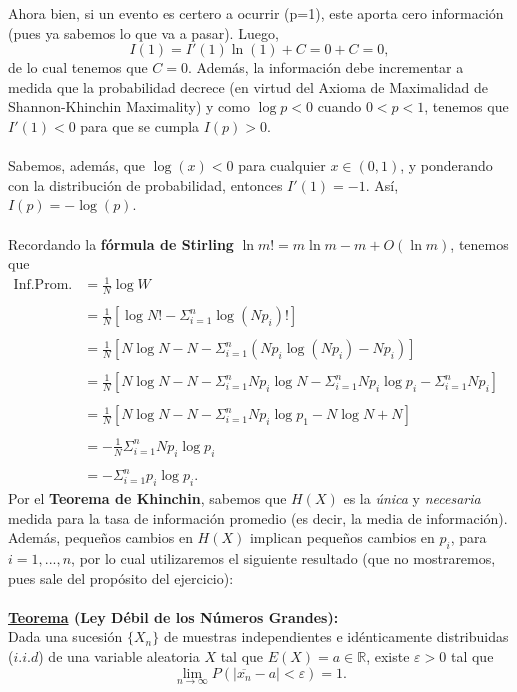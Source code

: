 \documentclass{article}
\begin{document}
Ahora bien, si un evento es certero a ocurrir (p=1), este aporta cero información (pues ya sabemos lo que va a pasar). Luego,\[I(1) = I'(1) \ln(1) + C = 0+ C = 0,\] de lo cual tenemos que $C=0$. Además, la información debe incrementar a medida que la probabilidad decrece (en virtud del Axioma de Maximalidad de Shannon-Khinchin Maximality) y como $\log p <0$ cuando $0 < p < 1$, tenemos que $I'(1)<0$ para que se cumpla $I(p)>0$. \\ \\
Sabemos, además, que $\log(x) < 0$ para cualquier $x \in (0,1)$, y ponderando con la distribución de probabilidad, entonces $I'(1) = -1$. Así, $I(p) = - \log (p)$. \\ \\
Recordando la \textbf{fórmula de Stirling} $\ln m! = m \ln m - m + O(\ln m)$, tenemos que
\begin{align*}
    \text{Inf.Prom.} &= \frac{1}{N} \log W &\\ \\
    &= \frac{1}{N} \left[ \log N! - \Sigma_{i=1}^n \log (N p_i)! \right] &\\ \\
    & = \frac{1}{N} \left[ N \log N - N - \Sigma_{i=1}^n (Np_i \log (Np_i) - Np_i) \right] &\\ \\
    & = \frac{1}{N} \left[  N \log N - N - \Sigma_{i=1}^n N p_i \log N - \Sigma_{i=1}^n N p_i \log p_i  -  \Sigma_{i=1}^n Np_i \right] &\\ \\
    & = \frac{1}{N} \left[ N \log N - N - \Sigma_{i=1}^n N p_i \log p_1 - N \log N + N \right] &\\ \\
    & = - \frac{1}{N} \Sigma_{i=1}^n N p_i \log p_i &\\ \\
    & = - \Sigma_{i=1}^n p_i \log p_i.
\end{align*}
Por el \textbf{Teorema de Khinchin}, sabemos que $H(X)$ es la \textit{única} y \textit{necesaria} medida para la tasa de información promedio (es decir, la media de información). Además, pequeños cambios en $H(X)$ implican pequeños cambios en $p_i$, para $i = 1, ... , n$, por lo cual utilizaremos el siguiente resultado (que no mostraremos, pues sale del propósito del ejercicio): \\ \\
\textbf{\underline{Teorema} (Ley Débil de los Números Grandes):} \\
Dada una sucesión $\{X_n\}$ de muestras independientes e idénticamente distribuidas ($i.i.d$) de una variable aleatoria $X$ tal que $E(X) = a \in \mathbb{R}$, existe $\varepsilon >0$ tal que \[ \lim_{n \longrightarrow \infty} P(|\overline{x_n}-a|< \varepsilon) = 1.\]
\end{document}
